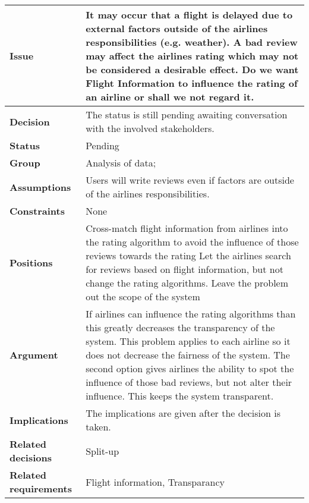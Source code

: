 
\begin{tabular}{ l  p{10cm}}
\hline
\bf Issue & It may occur that a flight is delayed due to external factors outside of the airlines responsibilities (e.g. weather). A bad review may affect the airlines rating which may not be considered a desirable effect. Do we want Flight Information to influence the rating of an airline or shall we not regard it.  \\
\hline
\bf Decision & The status is still pending awaiting conversation with the involved stakeholders.\\
\hline
\bf Status & Pending\\
\hline
\bf Group & Analysis of data; \\
\hline
\bf Assumptions & Users will write reviews even if factors are outside of the airlines responsibilities.\\
\hline
\bf Constraints & None \\
\hline
\bf Positions & Cross-match flight information from airlines into the rating algorithm to avoid the influence of those reviews towards the rating \newline\newline
Let the airlines search for reviews based on flight information, but not change the rating algorithms. \newline\newline
Leave the problem out the scope of the system 
\\
\hline
\bf Argument & If airlines can influence the rating algorithms than this greatly decreases the transparency of the system. This problem applies to each airline so it does not decrease the fairness of the system. The second option gives airlines the ability to spot the influence of those bad reviews, but not alter their influence. This keeps the system transparent. \\
\hline
\bf Implications &The implications are given after the decision is taken.  \\
\hline
\bf Related decisions & Split-up\\
\hline
\bf Related requirements  & Flight information, Transparancy \\
\hline
\end{tabular}
